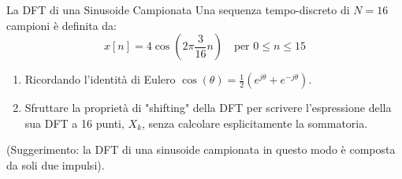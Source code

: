 
\begin{esercizio}{La DFT di una Sinusoide Campionata}
    Una sequenza tempo-discreto di $N=16$ campioni è definita da:
    \[
        x[n] = 4 \cos\left(2\pi \frac{3}{16} n\right) \quad \text{per } 0 \leq n \leq 15
    \]
    \begin{enumerate}
        \item Ricordando l'identità di Eulero $\cos(\theta) = \frac{1}{2}(e^{j\theta} + e^{-j\theta})$.
        \item Sfruttare la proprietà di "shifting" della DFT per scrivere l'espressione della sua DFT a 16 punti, $X_k$, senza calcolare esplicitamente la sommatoria. 
    \end{enumerate}
    (Suggerimento: la DFT di una sinusoide campionata in questo modo è composta da soli due impulsi).
\end{esercizio}